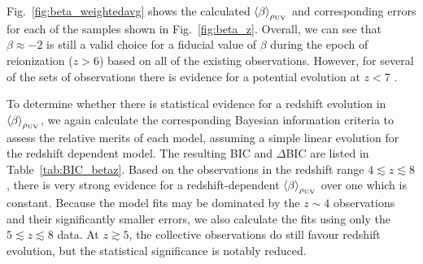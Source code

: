 Fig.~\ref{fig:beta_weightedavg} shows the calculated $\left \langle \beta  \right \rangle_{\rho_{\rm{UV}}}$ and corresponding errors for each of the samples shown in Fig.~\ref{fig:beta_z}. Overall, we can see that $\beta \approx -2$ is still a valid choice for a fiducial value of $\beta$ during the epoch of reionization ($z > 6$) based on all of the existing observations. However, for several of the sets of observations there is evidence for a potential evolution at $z < 7$ \citep{Wilkins:2011fs,Finkelstein:2012hr,Bouwens:2013vf,Duncan:2014gh}. 

To determine whether there is statistical evidence for a redshift evolution in $\left \langle \beta  \right \rangle_{\rho_{\rm{UV}}}$, we again calculate the corresponding Bayesian information criteria to assess the relative merits of each model, assuming a simple linear evolution for the redshift dependent model. The resulting BIC and $\Delta$BIC are listed in Table~\ref{tab:BIC_betaz}. Based on the observations in the redshift range $4 \lesssim z \lesssim 8$, there is very strong evidence for a redshift-dependent $\left \langle \beta  \right \rangle_{\rho_{\rm{UV}}}$ over one which is constant. Because the model fits may be dominated by the $z\sim 4$ observations and their significantly smaller errors, we also calculate the fits using only the $5 \lesssim z \lesssim 8$ data. At $z \gtrsim 5$, the collective observations do still favour redshift evolution, but the statistical significance is notably reduced.

